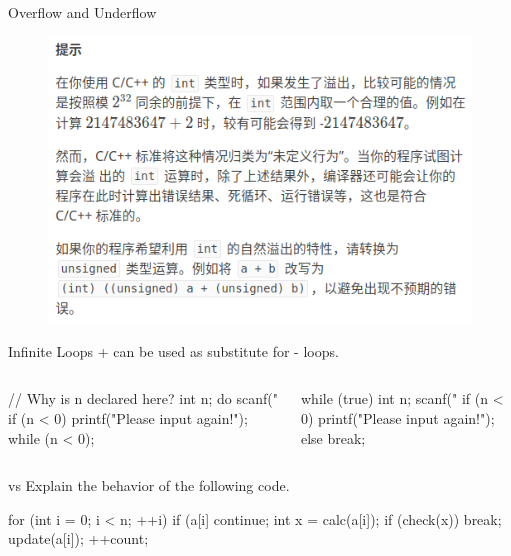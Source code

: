 \documentclass{beamer}
\begin{document}
\begin{frame}{Overflow and Underflow}
    \begin{figure}[h]
        \centering
        \includegraphics[scale = 0.5]{img/from-luogu.png}
    \end{figure}
\end{frame}

\begin{frame}[fragile]{Infinite Loops}
     +  can be used as substitute for - loops.
    \begin{columns}
        \begin{cpp}
// Why is n declared here?
int n;
do {
  scanf("%
  if (n < 0)
    printf("Please input again!\n");
} while (n < 0);
        \end{cpp}
        \begin{cpp}
while (true) {
  int n;
  scanf("%
  if (n < 0)
    printf("Please input again!\n");
  else
    break;
}
        \end{cpp}
    \end{columns}
\end{frame}

\begin{frame}[fragile]{ vs }
    Explain the behavior of the following code.
    \begin{cpp}
for (int i = 0; i < n; ++i) {
  if (a[i] %
    continue;
  int x = calc(a[i]);
  if (check(x))
    break;
  update(a[i]);
  ++count;
}
    \end{cpp}
\end{frame}
\end{document}
